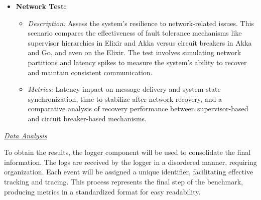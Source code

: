 \begin{itemize}

    
    \item \textbf{Network Test:}
    \begin{itemize}
        \item \textit{Description:} Assess the system's resilience to network-related issues. This scenario compares the effectiveness of fault tolerance mechanisms like supervisor hierarchies in Elixir and Akka versus circuit breakers in Akka and Go, and even on the Elixir. The test involves simulating network partitions and latency spikes to measure the system's ability to recover and maintain consistent communication.
        \item \textit{Metrics:} Latency impact on message delivery and system state synchronization, time to stabilize after network recovery, and a comparative analysis of recovery performance between supervisor-based and circuit breaker-based mechanisms.
    \end{itemize}
\end{itemize}

\textit{\underline{Data Analysis}}

To obtain the results, the logger component will be used to consolidate the final information. The logs are received by the logger in a disordered manner, requiring organization. Each event will be assigned a unique identifier, facilitating effective tracking and tracing. This process represents the final step of the benchmark, producing metrics in a standardized format for easy readability.
